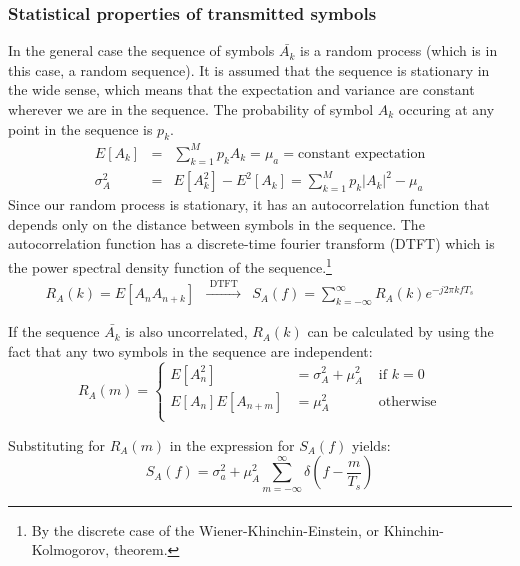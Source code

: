 \documentclass[onecolumn,x11names,technote,twoside,a4paper,12pt,english]{IEEEtran}
\begin{document}
\subsubsection{Statistical properties of transmitted symbols}
\label{sec:stat-symbs}

In the general case the sequence of symbols $\bar{A_k}$ is a random process (which is in this case, a random sequence). It is assumed that the sequence is stationary in the wide sense, which means that the expectation and variance are constant wherever we are in the sequence. The probability of symbol $A_k$ occuring at any point in the sequence is $p_k$. 
\begin{eqnarray*}
  E\left[A_k\right] &=& \sum_{k=1}^M{p_k A_k} = \mu_a = \text{constant expectation} \\
  \sigma_A^2 &=& E\left[A_k^2\right] - E^2\left[A_k\right] = \sum_{k=1}^M{p_k |A_k|^2} - \mu_a
\end{eqnarray*}
Since our random process is stationary, it has an autocorrelation function that depends only on the distance between symbols in the sequence. The autocorrelation function has a discrete-time fourier transform (DTFT) which is the power spectral density function of the sequence.\footnote{By the discrete case of the Wiener-Khinchin-Einstein, or Khinchin-Kolmogorov, theorem.}
\begin{eqnarray*}
  R_A(k) = E \left[ A_nA_{n+k} \right] &\xrightarrow{\mbox{ DTFT }}& S_A(f) = \sum_{k=-\infty}^{\infty} {R_A(k) e^{-j 2\pi k f T_s} }
\end{eqnarray*}

If the sequence $\bar{A_k}$ is also uncorrelated, $R_A(k)$ can be calculated by using the fact that any two symbols in the sequence are independent:
\begin{equation*}
  R_A(m) = \left\{ \begin{array}{rll} E\left[A_n^2\right] &= \sigma_A^2 + \mu_A^2 &\mbox{ if $k=0$} \\
                                     E\left[A_n\right]E\left[A_{n+m}\right] &= \mu_A^2 &\mbox{ otherwise} \\
                   \end{array} \right.
\end{equation*}

Substituting for $R_A(m)$ in the expression for $S_A(f)$ yields:
\begin{equation*}
  S_A(f) = \sigma_a^2 + \mu_A^2 \sum_{m=-\infty}^{\infty}{\delta(f - \frac{m}{T_s})}
\end{equation*}
\end{document}
